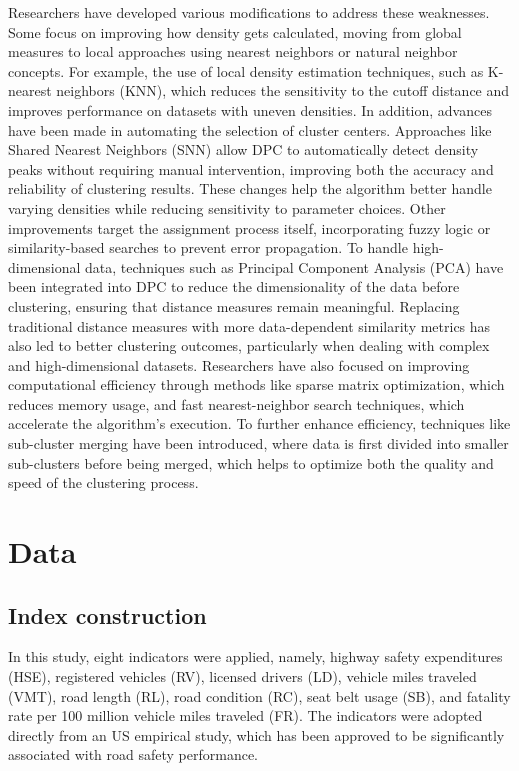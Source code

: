 \documentclass{article}
\begin{document}
Researchers have developed various modifications to address these weaknesses. Some focus on improving how density gets calculated, moving from global measures to local approaches using nearest neighbors or natural neighbor concepts. For example, the use of local density estimation techniques, such as K-nearest neighbors (KNN), which reduces the sensitivity to the cutoff distance and improves performance on datasets with uneven densities. In addition, advances have been made in automating the selection of cluster centers. Approaches like Shared Nearest Neighbors (SNN) allow DPC to automatically detect density peaks without requiring manual intervention, improving both the accuracy and reliability of clustering results. These changes help the algorithm better handle varying densities while reducing sensitivity to parameter choices. Other improvements target the assignment process itself, incorporating fuzzy logic or similarity-based searches to prevent error propagation. To handle high-dimensional data, techniques such as Principal Component Analysis (PCA) have been integrated into DPC to reduce the dimensionality of the data before clustering, ensuring that distance measures remain meaningful. Replacing traditional distance measures with more data-dependent similarity metrics has also led to better clustering outcomes, particularly when dealing with complex and high-dimensional datasets. Researchers have also focused on improving computational efficiency through methods like sparse matrix optimization, which reduces memory usage, and fast nearest-neighbor search techniques, which accelerate the algorithm's execution. To further enhance efficiency, techniques like sub-cluster merging have been introduced, where data is first divided into smaller sub-clusters before being merged, which helps to optimize both the quality and speed of the clustering process.

\section{Data}

\subsection{Index construction}
In this study, eight indicators were applied, namely, highway safety expenditures (HSE), registered vehicles (RV), licensed drivers (LD), vehicle miles traveled (VMT), road length (RL), road condition (RC), seat belt usage (SB), and fatality rate per 100 million vehicle miles traveled (FR). The indicators were adopted directly from an US empirical study, which has been approved to be significantly associated with road safety performance.
\end{document}

